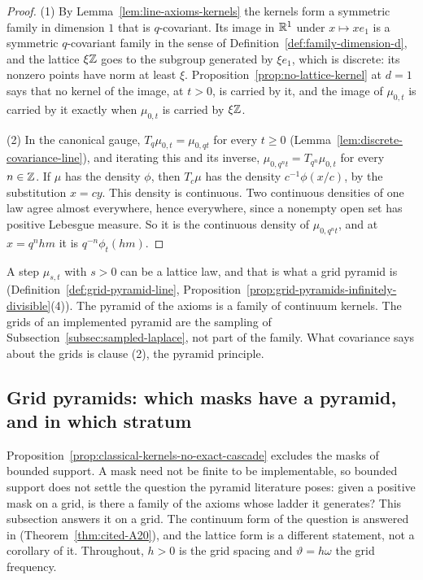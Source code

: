 \begin{proof}
\leanok
{}
(1) By Lemma~\ref{lem:line-axioms-kernels} the kernels form a symmetric family in dimension $1$
that is $q$-covariant. Its image in $\mathbb{R}^1$ under $x \mapsto xe_1$ is a symmetric $q$-covariant
family in the sense of Definition~\ref{def:family-dimension-d}, and the lattice $\xi\mathbb{Z}$ goes to
the subgroup generated by $\xi e_1$, which is discrete: its nonzero points have norm at least
$\xi$. Proposition~\ref{prop:no-lattice-kernel} at $d = 1$ says that no kernel of the image, at
$t > 0$, is carried by it, and the image of $\mu_{0,t}$ is carried by it exactly when $\mu_{0,t}$ is
carried by $\xi\mathbb{Z}$.

(2) In the canonical gauge, $T_q\mu_{0,t} = \mu_{0,qt}$ for every $t \ge 0$
(Lemma~\ref{lem:discrete-covariance-line}), and iterating this and its inverse,
$\mu_{0,q^nt} = T_{q^n}\mu_{0,t}$ for every $n \in \mathbb{Z}$. If $\mu$ has the density $\phi$, then
$T_c\mu$ has the density $c^{-1}\phi(x/c)$, by the substitution $x = cy$. This density is
continuous. Two continuous densities of one law agree almost everywhere, hence everywhere, since a
nonempty open set has positive Lebesgue measure. So it is the continuous density of
$\mu_{0,q^nt}$, and at $x = q^nhm$ it is $q^{-n}\phi_t(hm)$.
\end{proof}

A step $\mu_{s,t}$ with $s > 0$ can be a lattice law, and that is what a grid pyramid is
(Definition~\ref{def:grid-pyramid-line}, Proposition~\ref{prop:grid-pyramids-infinitely-divisible}(4)).
The pyramid of the axioms is a family of continuum kernels. The grids of an implemented pyramid
are the sampling of Subsection~\ref{subsec:sampled-laplace}, not part of the family. What
covariance says about the grids is clause (2), the pyramid principle.

\subsection{Grid pyramids: which masks have a pyramid, and in which stratum}
\label{subsec:grid-pyramids-line}

Proposition~\ref{prop:classical-kernels-no-exact-cascade} excludes the masks of bounded support.
A mask need not be finite to be implementable, so bounded support does not settle the question the
pyramid literature poses: given a positive mask on a grid, is there a family of the axioms whose
ladder it generates? This subsection answers it on a grid. The continuum form of the question is
answered in  (Theorem~\ref{thm:cited-A20}), and the lattice
form is a different statement, not a corollary of it. Throughout, $h > 0$ is the grid spacing and $\vartheta = h\omega$ the grid
frequency.

